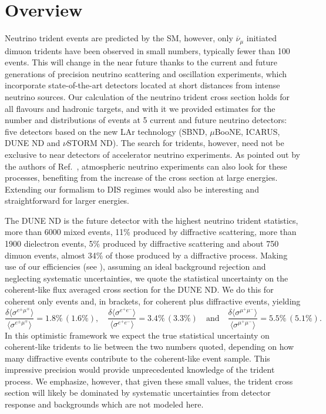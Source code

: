 \section{Overview} \label{sec:conc}
Neutrino trident events are predicted by the SM, however, only $\overline{\nu}_\mu$ initiated dimuon tridents have been observed in small numbers, typically fewer than 100 events. This will change in the near future thanks to the current and future generations of precision neutrino scattering and oscillation experiments, which incorporate state-of-the-art detectors located at short distances from intense neutrino sources. 
%
Our calculation of the neutrino trident cross section holds for all flavours and hadronic targets, and with it we provided estimates for the number and distributions of events at 5 current and future neutrino detectors: five detectors based on the new LAr technology (SBND, $\mu$BooNE, ICARUS, DUNE ND and $\nu$STORM ND). The search for tridents, however, need not be exclusive to near detectors of accelerator neutrino experiments. As pointed out by the authors of Ref.~\cite{Ge2017}, atmospheric neutrino experiments can also look for these processes, benefiting from the increase of the cross section at large energies. Extending our formalism to DIS regimes would also be interesting and straightforward for larger energies.

The DUNE ND is the future detector with the highest neutrino trident statistics, more than 6000 mixed events, 11\% produced by diffractive scattering, more than 1900 dielectron events, 5\%  produced by diffractive scattering and about 750 dimuon events, almost 34\% of those produced by a diffractive process. Making use of our efficiencies (see ), assuming an ideal background rejection and neglecting systematic uncertainties, we quote the statistical uncertainty on the coherent-like flux averaged cross section for the DUNE ND. We do this for coherent only events and, in brackets, for coherent plus diffractive events, yielding
%
\[\frac{\delta \langle \sigma^{e^\pm\mu^\mp} \rangle}{\langle \sigma^{e^\pm\mu^\mp} \rangle} =  1.8\% \, (1.6\%), \quad \frac{\delta \langle \sigma^{e^+e^-} \rangle}{\langle \sigma^{e^+e^-} \rangle} =  3.4\% \,(3.3\%) \quad \mathrm{and} \quad \frac{\delta \langle\sigma^{\mu^+\mu^-} \rangle}{\langle \sigma^{\mu^+\mu^-} \rangle} =  5.5\% \,(5.1\%).\]
%
In this optimistic framework we expect the true statistical uncertainty on coherent-like tridents to lie between the two numbers quoted, depending on how many diffractive events contribute to the coherent-like event sample. This impressive precision would provide unprecedented knowledge of the trident process. We emphasize, however, that given these small values, the trident cross section will likely be dominated by systematic uncertainties from detector response and backgrounds which are not modeled here. 
